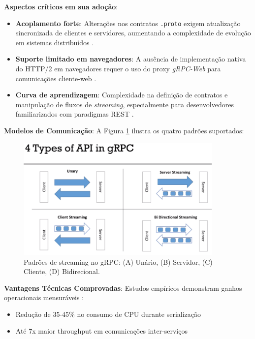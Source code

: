 \textbf{Aspectos críticos em sua adoção}:
\begin{itemize}
\item \textbf{Acoplamento forte}: Alterações nos contratos \texttt{.proto} exigem atualização sincronizada de clientes e servidores, aumentando a complexidade de evolução em sistemas distribuídos \cite{ibm:7}.
\item \textbf{Suporte limitado em navegadores}: A ausência de implementação nativa do HTTP/2 em navegadores requer o uso do proxy \textit{gRPC-Web} para comunicações cliente-web \cite{wallarm:4}.
\item \textbf{Curva de aprendizagem}: Complexidade na definição de contratos e manipulação de fluxos de \textit{streaming}, especialmente para desenvolvedores familiarizados com paradigmas REST \cite{marutitech:9}.
\end{itemize}

\textbf{Modelos de Comunicação}:
A Figura \ref{fig:grpc_streaming} ilustra os quatro padrões suportados:

\begin{figure}[h]
\centering
\includegraphics[width=0.9\textwidth]{images/grpc.png}
\caption{Padrões de streaming no gRPC: (A) Unário, (B) Servidor, (C) Cliente, (D) Bidirecional.}
\label{fig:grpc_streaming}
\end{figure}

\textbf{Vantagens Técnicas Comprovadas}:
Estudos empíricos demonstram ganhos operacionais mensuráveis \cite{niswar2023performance}:
\begin{itemize}
\item Redução de 35-45\% no consumo de CPU durante serialização
\item Até 7x maior throughput em comunicações inter-serviços
\end{itemize}

